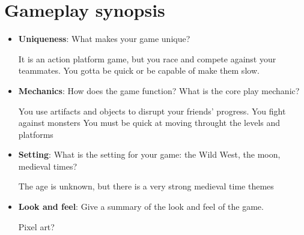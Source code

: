 \section{Gameplay synopsis}%


\begin{itemize}
    \item \textbf{Uniqueness}: What makes your game unique?

    It is an action platform game, but you race and compete against your
    teammates. You gotta be quick or be capable of make them slow.

    \item \textbf{Mechanics}: How does the game function? What is the core play mechanic?

    You use artifacts and objects to disrupt your friends' progress.
    You fight against monsters
    You must be quick at moving throught the levels and platforms

    \item \textbf{Setting}: What is the setting for your game: the Wild West, the moon, medieval times?

    The age is unknown, but there is a very strong medieval time themes

    \item \textbf{Look and feel}: Give a summary of the look and feel of the game.

    Pixel art?

\end{itemize}

